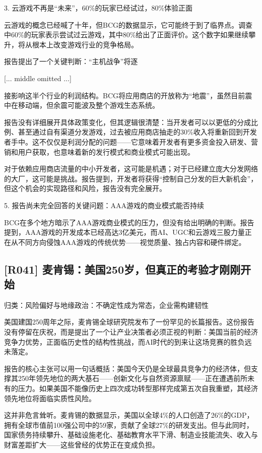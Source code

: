 \documentclass[11pt]{ctexart}
\begin{document}
3. 云游戏不再是“未来”，60\%的玩家已经试过，80\%体验正面

云游戏的概念已经喊了十年，但BCG的数据显示，它可能终于到了临界点。调查中60\%的玩家表示尝试过云游戏，其中80\%给出了正面评价。这个数字如果继续攀升，将从根本上改变游戏行业的竞争格局。

报告提出了一个关键判断：“主机战争”将逐

[... middle omitted ...]

接影响这半个行业的利润结构。BCG将应用商店的开放称为“地震”，虽然目前震中在移动端，但余震可能波及整个游戏生态系统。

报告没有详细展开具体政策变化，但其逻辑很清楚：当开发者可以以更低的分成比例、甚至通过自有渠道分发游戏，过去被应用商店抽走的30\%收入将重新回到开发者手中。这不仅仅是利润分配的问题——它意味着开发者有更多资金投入研发、营销和用户获取，也意味着新的发行模式和商业模式可能出现。

对于依赖应用商店流量的中小开发者，这可能是机遇；对于已经建立庞大分发网络的大厂，这可能是挑战。报告提到，开发者将获得“控制自己分发的巨大新机会”，但这个机会的实现路径和风险，报告没有完全展开。

5. 报告尚未完全回答的关键问题：AAA游戏的商业模式能否持续

BCG在多个地方暗示了AAA游戏商业模式的压力，但没有给出明确的判断。报告提到，AAA游戏的开发成本已经高达3亿美元，而AI、UGC和云游戏三股力量正在从不同方向侵蚀AAA游戏的传统优势——视觉质量、独占内容和硬件绑定。

\subsection{[R041] 麦肯锡：美国250岁，但真正的考验才刚刚开始}
{\small\color{refgray}归类：风险偏好与地缘政治：不确定性成为常态，企业需构建韧性}

美国建国250周年之际，麦肯锡全球研究院发布了一份罕见的长篇报告。这份报告没有停留在庆祝，而是提出了一个让产业决策者必须正视的判断：美国当前的经济竞争力优势，正面临历史性的结构性挑战，而AI时代的到来让这场竞赛的胜负远未落定。

报告的核心主张可以用一句话概括：美国今天仍是全球最具竞争力的经济体，但支撑其250年领先地位的两大基石——创新文化与自然资源禀赋——正在遭遇前所未有的压力。如果美国不能像历史上四次成功转型那样完成第五次自我重塑，其经济领先地位将面临实质性风险。

这并非危言耸听。麦肯锡的数据显示，美国以全球4\%的人口创造了26\%的GDP，拥有全球市值前100强公司中的59家，贡献了全球27\%的研发支出。但与此同时，国家债务持续攀升、基础设施老化、基础教育水平下滑、制造业技能流失、收入与财富差距扩大——这些曾经的优势正在变成负担。
\end{document}

